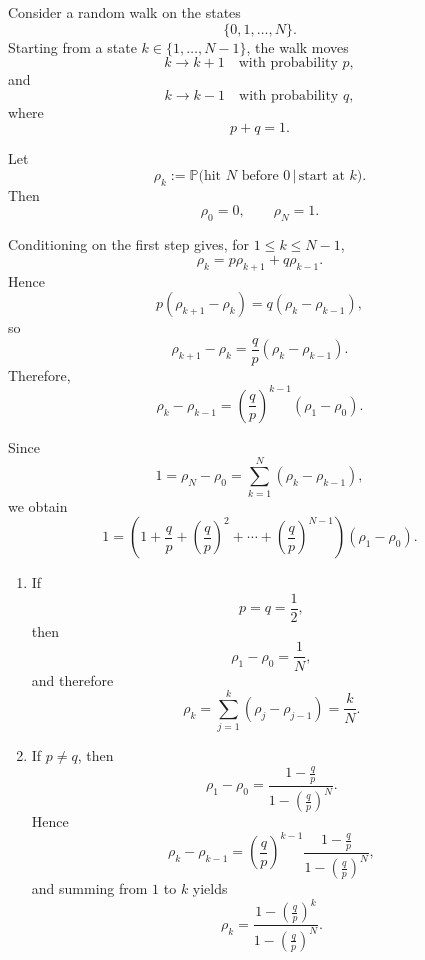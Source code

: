 \begin{exampleenv}
    Consider a random walk on the states
    \[
        \{0,1,\ldots,N\}.
    \]
    Starting from a state $k\in\{1,\ldots,N-1\}$, the walk moves
    \[
        k\to k+1 \quad \text{with probability } p,
    \]
    and
    \[
        k\to k-1 \quad \text{with probability } q,
    \]
    where
    \[
        p+q=1.
    \]

    Let
    \[
        \rho_k
        :=
        \mathbb{P}
        \bigl(
            \text{hit $N$ before $0$}
            \,\big|\,
            \text{start at $k$}
        \bigr).
    \]
    Then
    \[
        \rho_0=0,
        \qquad
        \rho_N=1.
    \]

    Conditioning on the first step gives, for $1\le k\le N-1$,
    \[
        \rho_k
        =
        p\rho_{k+1}+q\rho_{k-1}.
    \]
    Hence
    \[
        p(\rho_{k+1}-\rho_k)
        =
        q(\rho_k-\rho_{k-1}),
    \]
    so
    \[
        \rho_{k+1}-\rho_k
        =
        \frac{q}{p}
        (\rho_k-\rho_{k-1}).
    \]
    Therefore,
    \[
        \rho_k-\rho_{k-1}
        =
        \left(\frac{q}{p}\right)^{k-1}
        (\rho_1-\rho_0).
    \]

    Since
    \[
        1
        =
        \rho_N-\rho_0
        =
        \sum_{k=1}^{N}
        (\rho_k-\rho_{k-1}),
    \]
    we obtain
    \[
        1
        =
        \left(
            1+\frac{q}{p}
            +\left(\frac{q}{p}\right)^2
            +\cdots
            +\left(\frac{q}{p}\right)^{N-1}
        \right)
        (\rho_1-\rho_0).
    \]

    \begin{enumerate}[label=(\arabic*)]
        \item If
        \[
            p=q=\frac12,
        \]
        then
        \[
            \rho_1-\rho_0=\frac1N,
        \]
        and therefore
        \[
            \rho_k
            =
            \sum_{j=1}^{k}
            (\rho_j-\rho_{j-1})
            =
            \frac{k}{N}.
        \]

        \item If $p\ne q$, then
        \[
            \rho_1-\rho_0
            =
            \frac{1-\frac{q}{p}}
                 {1-\left(\frac{q}{p}\right)^N}.
        \]
        Hence
        \[
            \rho_k-\rho_{k-1}
            =
            \left(\frac{q}{p}\right)^{k-1}
            \frac{1-\frac{q}{p}}
                 {1-\left(\frac{q}{p}\right)^N},
        \]
        and summing from $1$ to $k$ yields
        \[
            \rho_k
            =
            \frac{
                1-\left(\frac{q}{p}\right)^k
            }{
                1-\left(\frac{q}{p}\right)^N
            }.
        \]
    \end{enumerate}


\end{exampleenv}
